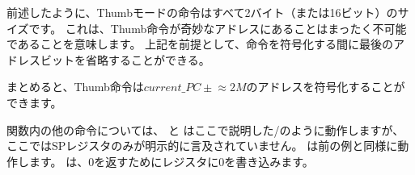 前述したように、Thumbモードの命令はすべて2バイト（または16ビット）のサイズです。
これは、Thumb命令が奇妙なアドレスにあることはまったく不可能であることを意味します。
上記を前提として、命令を符号化する間に最後のアドレスビットを省略することができる。

まとめると、Thumb命令は$current\_PC \pm{}\approx{}2M$のアドレスを符号化することができます。

関数内の他の命令については、 \PUSH と \POP はここで説明した/のように動作しますが、ここでは\ac{SP}レジスタのみが明示的に言及されていません。 
は前の例と同様に動作します。 
は、0を返すためにレジスタに0を書き込みます。

